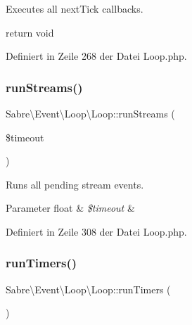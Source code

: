 Executes all \textquotesingle{}next\+Tick\textquotesingle{} callbacks.

return void 

Definiert in Zeile 268 der Datei Loop.\+php.

\mbox{\label{class_sabre_1_1_event_1_1_loop_1_1_loop_a54c3ac0ed67f872108ea4eff28a80703}} 
\subsubsection{\texorpdfstring{run\+Streams()}{runStreams()}}
{\footnotesize\ttfamily Sabre\textbackslash{}\+Event\textbackslash{}\+Loop\textbackslash{}\+Loop\+::run\+Streams (\begin{DoxyParamCaption}\item[{}]{\$timeout }\end{DoxyParamCaption})\hspace{0.3cm}{\ttfamily [protected]}}

Runs all pending stream events.


\begin{DoxyParams}[1]{Parameter}
float & {\em \$timeout} & \\
\hline
\end{DoxyParams}


Definiert in Zeile 308 der Datei Loop.\+php.

\mbox{\label{class_sabre_1_1_event_1_1_loop_1_1_loop_a94fcec1fcdf17207fc39b24126202a3e}} 
\subsubsection{\texorpdfstring{run\+Timers()}{runTimers()}}
{\footnotesize\ttfamily Sabre\textbackslash{}\+Event\textbackslash{}\+Loop\textbackslash{}\+Loop\+::run\+Timers (\begin{DoxyParamCaption}{ }\end{DoxyParamCaption})\hspace{0.3cm}{\ttfamily [protected]}}

